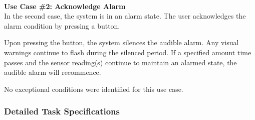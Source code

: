 \documentclass[12pt]{article} %
\begin{document}
~\\
\textbf{Use Case \#2: Acknowledge Alarm} \\
In the second case, the system is in an alarm state. The user acknowledges
the alarm condition by pressing a button.

Upon pressing the button, the system silences the audible alarm. Any visual warnings continue to flash during the silenced period. If a specified amount 
time passes and the sensor reading(s) continue to maintain an alarmed state,
the audible alarm will recommence.

No exceptional conditions were identified for this use case.\\

\subsubsection{Detailed Task Specifications}
\end{document}
